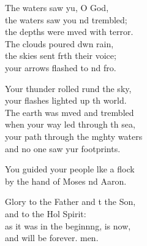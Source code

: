 \begin{psalmverse}
\begin{patverse}
The waters saw yu, O God,\Med\\
the waters saw you nd trembled;\\
the depths were mved with terror.\Med\\
The clouds poured dwn rain,\\
the skies sent frth their voice;\Med\\
your arrows flashed to nd fro.

Your thunder rolled rund the sky,\Med\\
your flashes lighted up th world.\\
The earth was mved and trembled\Med\\
when your way led through th sea,\\
your path through the m\pointup{\i}ghty waters\Med\\
and no one saw yur footprints.

You guided your people l\pointup{\i}ke a flock\Med\\
by the hand of Moses nd Aaron.

Glory to the Father and t the Son,\Med\\
and to the Hol Spirit:\\
as it was in the beginn\pointup{\i}ng, is now,\Med\\
and will be forever. men.
  \end{patverse}
\end{psalmverse}

